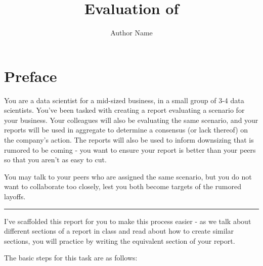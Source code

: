 \documentclass[
  letterpaper,
  DIV=11,
  numbers=noendperiod]{scrreprt}
\title{Evaluation of}
\author{Author Name}
\date{}
\renewcommand*\contentsname{Table of contents}
\newcommand\contentsname{Table of contents}
\begin{document}
\maketitle

\renewcommand*\contentsname{Table of contents}
{
\hypersetup{linkcolor=}
\setcounter{tocdepth}{2}
\tableofcontents
}


\chapter*{Preface}\label{preface}


You are a data scientist for a mid-sized business, in a small group of
3-4 data scientists. You've been tasked with creating a report
evaluating a scenario for your business. Your colleagues will also be
evaluating the same scenario, and your reports will be used in aggregate
to determine a consensus (or lack thereof) on the company's action. The
reports will also be used to inform downsizing that is rumored to be
coming - you want to ensure your report is better than your peers so
that you aren't as easy to cut.

You may talk to your peers who are assigned the same scenario, but you
do not want to collaborate too closely, lest you both become targets of
the rumored layoffs.

\begin{center}\rule{0.5\linewidth}{0.5pt}\end{center}

I've scaffolded this report for you to make this process easier - as we
talk about different sections of a report in class and read about how to
create similar sections, you will practice by writing the equivalent
section of your report.

The basic steps for this task are as follows:
\end{document}
